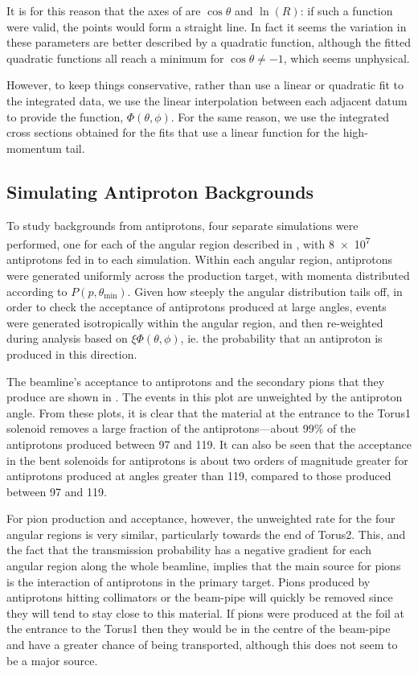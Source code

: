 It is for this reason that the axes of  are $\cos\theta$ and $\ln(R)$: if such a function were valid, the points would form a straight line.
In fact it seems the variation in these parameters are better described by a quadratic function, although the fitted quadratic functions all reach a minimum for $\cos\theta\ne-1$, which seems unphysical.

However, to keep things conservative, rather than use  a linear or quadratic fit to the integrated data, we use the linear interpolation between each adjacent datum to provide the function, $\Phi(\theta,\phi)$.
For the same reason, we use the integrated cross sections obtained for the fits that use a linear function for the high-momentum tail.

\TabAntiprotonRegions
\subsection{Simulating Antiproton Backgrounds}
\FigAntiprotonSimFluxes
To study backgrounds from antiprotons, four separate simulations were performed, one for each of the angular region described in , with \num{8e7} antiprotons fed in to each simulation.
Within each angular region, antiprotons were generated uniformly across the production target, with momenta distributed according to $P(p,\theta_\textrm{min})$.
Given how steeply the angular distribution tails off, in order to check the acceptance of antiprotons produced at large angles, events were generated isotropically within the angular region, and then re-weighted during analysis based on $\xi\Phi(\theta,\phi)$, ie. the probability that an antiproton is produced in this direction.

The beamline's acceptance to antiprotons and the secondary pions that they produce are shown in .
The events in this plot are unweighted by the antiproton angle.
From these plots, it is clear that the material at the entrance to the Torus1 solenoid removes a large fraction of the antiprotons---about 99\% of the antiprotons produced between 97 and 119\degree.
It can also be seen that the acceptance in the bent solenoids for antiprotons is about two orders of magnitude greater for antiprotons produced at angles greater than 119\degree, compared to those produced between 97 and 119\degree.

For pion production and acceptance, however, the unweighted rate for the four angular regions is very similar, particularly towards the end of Torus2.
This, and the fact that the transmission probability has a negative gradient for each angular region along the whole beamline, implies that the main source for pions is the interaction of antiprotons in the primary target.
Pions produced by antiprotons hitting collimators or the beam-pipe will quickly be removed since they will tend to stay close to this material.
If pions were produced at the foil at the entrance to the Torus1 then they would be in the centre of the beam-pipe and have a greater chance of being transported, although this does not seem to be a major source.

